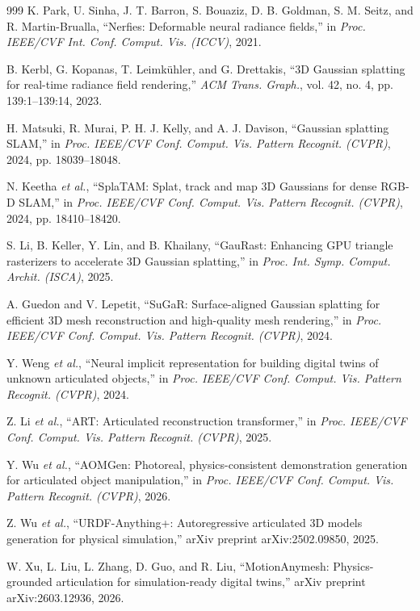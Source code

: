 \documentclass[12pt,a4paper,oneside]{report}
\begin{document}
\begin{thebibliography}{999}
K. Park, U. Sinha, J. T. Barron, S. Bouaziz, D. B. Goldman, S. M. Seitz, and R. Martin-Brualla, ``Nerfies: Deformable neural radiance fields,'' in \textit{Proc. IEEE/CVF Int. Conf. Comput. Vis. (ICCV)}, 2021.

B. Kerbl, G. Kopanas, T. Leimk\"{u}hler, and G. Drettakis, ``{3D} Gaussian splatting for real-time radiance field rendering,'' \textit{ACM Trans. Graph.}, vol. 42, no. 4, pp. 139:1--139:14, 2023.

H. Matsuki, R. Murai, P. H. J. Kelly, and A. J. Davison, ``Gaussian splatting {SLAM},'' in \textit{Proc. IEEE/CVF Conf. Comput. Vis. Pattern Recognit. (CVPR)}, 2024, pp. 18039--18048.

N. Keetha \textit{et al.}, ``{SplaTAM}: Splat, track and map {3D} Gaussians for dense {RGB-D SLAM},'' in \textit{Proc. IEEE/CVF Conf. Comput. Vis. Pattern Recognit. (CVPR)}, 2024, pp. 18410--18420.

S. Li, B. Keller, Y. Lin, and B. Khailany, ``{GauRast}: Enhancing {GPU} triangle rasterizers to accelerate {3D} Gaussian splatting,'' in \textit{Proc. Int. Symp. Comput. Archit. (ISCA)}, 2025.

A. Guedon and V. Lepetit, ``{SuGaR}: Surface-aligned {Gaussian} splatting for efficient {3D} mesh reconstruction and high-quality mesh rendering,'' in \textit{Proc. IEEE/CVF Conf. Comput. Vis. Pattern Recognit. (CVPR)}, 2024.

Y. Weng \textit{et al.}, ``Neural implicit representation for building digital twins of unknown articulated objects,'' in \textit{Proc. IEEE/CVF Conf. Comput. Vis. Pattern Recognit. (CVPR)}, 2024.

Z. Li \textit{et al.}, ``{ART}: Articulated reconstruction transformer,'' in \textit{Proc. IEEE/CVF Conf. Comput. Vis. Pattern Recognit. (CVPR)}, 2025.

Y. Wu \textit{et al.}, ``{AOMGen}: Photoreal, physics-consistent demonstration generation for articulated object manipulation,'' in \textit{Proc. IEEE/CVF Conf. Comput. Vis. Pattern Recognit. (CVPR)}, 2026.

Z. Wu \textit{et al.}, ``{URDF-Anything+}: Autoregressive articulated {3D} models generation for physical simulation,'' arXiv preprint arXiv:2502.09850, 2025.

W. Xu, L. Liu, L. Zhang, D. Guo, and R. Liu, ``{MotionAnymesh}: Physics-grounded articulation for simulation-ready digital twins,'' arXiv preprint arXiv:2603.12936, 2026.


\end{thebibliography}
\end{document}
